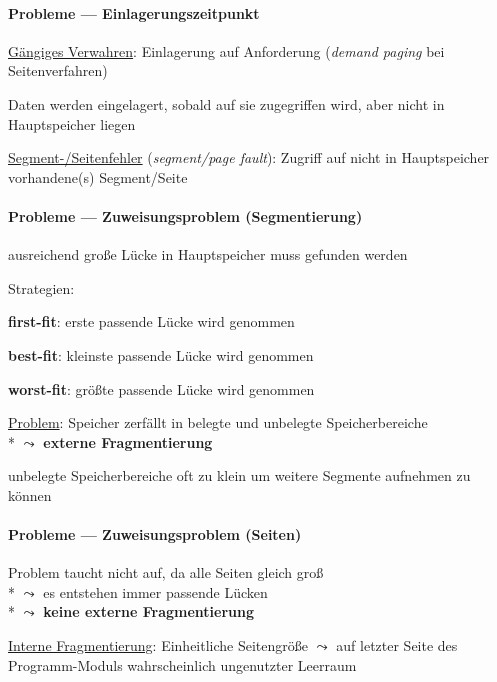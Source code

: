 \paragraph{Probleme --- Einlagerungszeitpunkt}
\begin{items}
  \item \underline{Gängiges Verwahren}: Einlagerung auf Anforderung (\emph{demand paging} bei Seitenverfahren)
  \item Daten werden eingelagert, sobald auf sie zugegriffen wird, aber nicht in Hauptspeicher liegen
  \item \underline{Segment-/Seitenfehler} (\emph{segment/page fault}): Zugriff auf nicht in Hauptspeicher vorhandene(s) Segment/Seite
\end{items}

\paragraph{Probleme --- Zuweisungsproblem (Segmentierung)}
\begin{items}
  \item ausreichend große Lücke in Hauptspeicher muss gefunden werden
  \item Strategien:
  \begin{enumeration}
    \item \textbf{first-fit}: erste passende Lücke wird genommen
    \item \textbf{best-fit}: kleinste passende Lücke wird genommen
    \item \textbf{worst-fit}: größte passende Lücke wird genommen
  \end{enumeration}
  \item \underline{Problem}: Speicher zerfällt in belegte und unbelegte Speicherbereiche \\*
    \( \leadsto \) \textbf{externe Fragmentierung}
  \item unbelegte Speicherbereiche oft zu klein um weitere Segmente aufnehmen zu können
\end{items}

\paragraph{Probleme --- Zuweisungsproblem (Seiten)}
\begin{items}
  \item Problem taucht nicht auf, da alle Seiten gleich groß \\*
    \( \leadsto \) es entstehen immer passende Lücken \\*
    \( \leadsto \) \textbf{keine externe Fragmentierung}
  \item \underline{Interne Fragmentierung}: Einheitliche Seitengröße \( \leadsto \) auf letzter Seite des Programm-Moduls wahrscheinlich ungenutzter Leerraum
\end{items}

